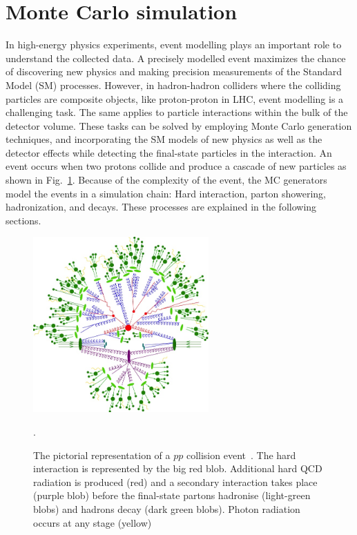 \section{Monte Carlo simulation}\label{sec:mc_sim}
In high-energy physics experiments, event modelling plays an important role to understand the collected data. A precisely modelled event maximizes the chance of discovering new physics and making precision measurements of the Standard Model (SM) processes. However, in hadron-hadron colliders where the colliding particles are composite objects, like proton-proton in LHC, event modelling is a challenging task. The same applies to particle interactions within the bulk of the detector volume. These tasks can be solved by employing Monte Carlo generation techniques, and incorporating the SM models of new physics as well as the detector effects while detecting the final-state particles in the interaction. An event occurs when two protons collide and produce a cascade of new particles as shown in Fig.~\ref{fig:event}. Because of the complexity of the event, the MC generators model the events in a simulation chain: Hard interaction, parton showering, hadronization, and decays. These processes are explained in the following sections.
\begin{figure}[h]
\centering
\includegraphics[width=0.6\textwidth]{fig/chapt4/event_sim.jpeg}
\caption{\label{fig:event}The pictorial representation of a $pp$ collision event~\cite{simulated_event}. The hard interaction is represented by the big red blob. Additional hard QCD radiation is produced (red) and a secondary interaction takes place (purple blob) before the final-state partons hadronise (light-green blobs) and hadrons decay (dark green blobs). Photon radiation occurs at any stage (yellow)}.
\end{figure}  
